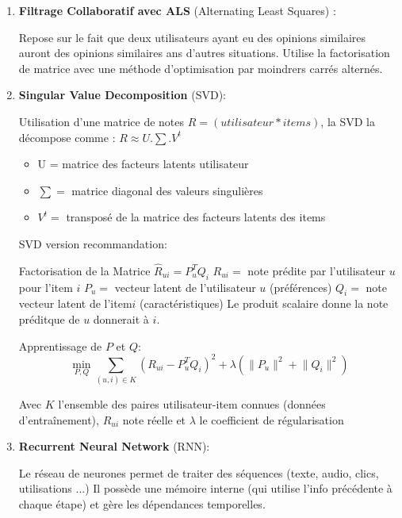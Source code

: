 \documentclass{article}
\begin{document}
    \begin{enumerate}
        \item \textbf{Filtrage Collaboratif avec ALS} (Alternating Least Squares) :

        Repose sur le fait que deux utilisateurs ayant eu des opinions similaires auront des opinions similaires ans d'autres situations. Utilise la factorisation de matrice avec une méthode d'optimisation par moindrers carrés alternés.
        \item \textbf{Singular Value Decomposition} (SVD):

        Utilisation d'une matrice de notes \(R = (utilisateur*items)\), la SVD la décompose comme : \(R \approx U . \sum .
        V^t\)

        \begin{itemize}
            \item U = matrice des facteurs latents utilisateur
            \item \(\sum=\) matrice diagonal des valeurs singulières
            \item \(V^t=\) transposé de la matrice des facteurs latents des items
        \end{itemize}
        SVD version recommandation:

        Factorisation de la Matrice \(\hat{R}_{ui} = P_u^T Q_i \)
        \newline
        \( R_{ui} = \) note prédite par l'utilisateur \(u\) pour l'item \(i\)
        \newline
        \(P_u = \) vecteur latent de l'utilisateur \(u\) (préférences)
        \newline
        \(Q_i = \) note vecteur latent de l'item\(i\) (caractéristiques)
        \newline
        Le produit scalaire donne la note préditque de \(u\) donnerait à \(i\).

        Apprentissage de \(P\) et \(Q\): \[ \min_{P, Q} \sum_{(u,i) \in K} \left( R_{ui} - P_u^T Q_i \right)^2 + \lambda \left( \lVert P_u \rVert^2 + \lVert Q_i \rVert^2 \right)\]

        Avec \(K\) l'ensemble des paires utilisateur-item connues (données d'entraînement), \(R_{ui}\) note réelle et \(\lambda\) le coefficient de régularisation

        \item \textbf{Recurrent Neural Network} (RNN):

        Le réseau de neurones permet de traiter des séquences (texte, audio, clics, utilisations ...) Il possède une mémoire interne (qui utilise l'info précédente à chaque étape) et gère les dépendances temporelles.


\end{enumerate}
\end{document}
